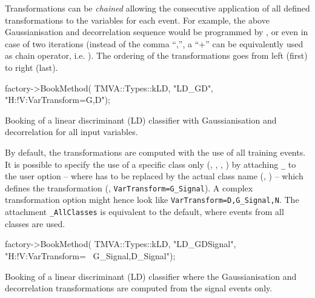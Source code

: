 Transformations can be {\em chained} allowing the consecutive application of all defined 
transformations to the variables for each event.
For example, the above Gaussianisation and decorrelation sequence would be programmed by 
, or even  in case of two iterations 
(instead of the comma ``,'', a ``+'' can be equivalently used as chain operator, 
i.e. ). The ordering of the transformations goes from 
left (first) to right (last). 

\begin{codeexample}
\begin{tmvacode}
factory->BookMethod( TMVA::Types::kLD, "LD_GD", "H:!V:VarTransform=G,D");
\end{tmvacode}
\caption[.]{\codeexampleCaptionSize Booking of a linear discriminant
  (LD) classifier with Gaussianisation and decorrelation for all input
  variables.  }
\end{codeexample}

By default, the transformations are computed with the use of all training events. It is 
possible to specify the use of a specific class only (\eg, , , 
) by attaching {\tt \_<class name>} to the user option -- 
where {\tt <class name>} has to be replaced by the actual class name 
(\eg, ) -- which defines the transformation (\eg, {\tt VarTransform=G\_Signal}). 
A complex transformation option might hence look like {\tt VarTransform=D,G\_Signal,N}.
The attachment {\tt \_AllClasses} is equivalent to the default, where events from all 
classes are used.

\begin{codeexample}
\begin{tmvacode}
factory->BookMethod( TMVA::Types::kLD, "LD_GDSignal", "H:!V:VarTransform= \
G_Signal,D_Signal");
\end{tmvacode}
\caption[.]{\codeexampleCaptionSize Booking of a linear discriminant
  (LD) classifier where the Gaussianisation and decorrelation
  transformations are computed from the signal events only.  }
\end{codeexample}

